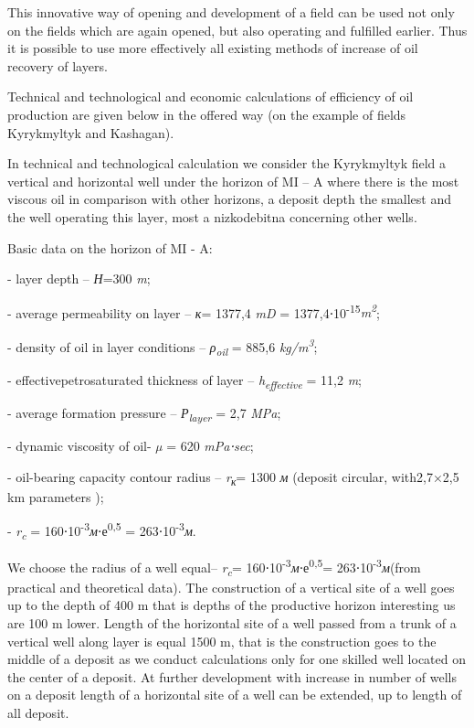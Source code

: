 This innovative way of opening and development of a field can be used
not only on the fields which are again opened, but also operating and
fulfilled earlier. Thus it is possible to use more effectively all
existing methods of increase of oil recovery of layers.

Technical and technological and economic calculations of efficiency of
oil production are given below in the offered way (on the example of
fields Kyrykmyltyk and Kashagan).

In technical and technological calculation we consider the Kyrykmyltyk
field a vertical and horizontal well under the horizon of MI -- A where
there is the most viscous oil in comparison with other horizons, a
deposit depth the smallest and the well operating this layer, most a
nizkodebitna concerning other wells.

Basic data on the horizon of MI - A:

- layer depth -- \emph{Н}=300 \emph{m};

- average permeability on layer -- \emph{к}= 1377,4 \emph{mD} =
1377,4⋅10\textsuperscript{-15}\emph{m\textsuperscript{2}};

- density of oil in layer conditions -- \emph{ρ\textsubscript{oil}} =
885,6 \emph{kg/m\textsuperscript{3}};

- effectivepetrosaturated thickness of layer --
\emph{h\textsubscript{effective}} = 11,2 \emph{m};

- average formation pressure -- \emph{Р\textsubscript{layer}} = 2,7
\emph{MPa};

- dynamic viscosity of oil- \emph{µ} = 620 \emph{mPa⋅sec};

- oil-bearing capacity contour radius -- \emph{r\textsubscript{к}}= 1300
\emph{м} (deposit circular, with2,7×2,5 km parameters );

- \emph{r\textsubscript{c}} =
160⋅10\textsuperscript{-3}\emph{м}⋅е\textsuperscript{0,5} =
263⋅10\textsuperscript{-3}\emph{м}.

We choose the radius of a well equal-- \emph{r\textsubscript{c}}=
160⋅10\textsuperscript{-3}\emph{м}⋅е\textsuperscript{0,5}=
263⋅10\textsuperscript{-3}\emph{м}(from practical and theoretical data).
The construction of a vertical site of a well goes up to the depth of
400 m that is depths of the productive horizon interesting us are 100 m
lower. Length of the horizontal site of a well passed from a trunk of a
vertical well along layer is equal 1500 m, that is the construction goes
to the middle of a deposit as we conduct calculations only for one
skilled well located on the center of a deposit. At further development
with increase in number of wells on a deposit length of a horizontal
site of a well can be extended, up to length of all deposit.

